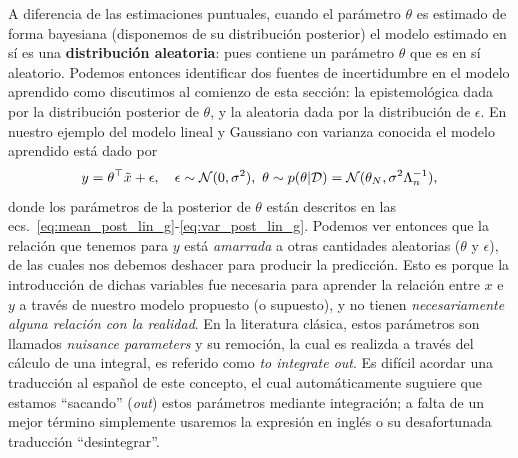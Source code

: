 A diferencia de las estimaciones puntuales, cuando el parámetro $\theta$ es estimado de forma bayesiana (disponemos de su distribución posterior) el modelo estimado en sí es una \textbf{distribución aleatoria}: pues  contiene un parámetro $\theta$ que es en sí aleatorio. Podemos entonces identificar dos fuentes de incertidumbre en el modelo aprendido como discutimos al comienzo de esta sección: la epistemológica dada por la distribución posterior de $\theta$, y la aleatoria dada por la distribución de $\epsilon$. En nuestro ejemplo del modelo lineal y Gaussiano con varianza conocida el modelo aprendido está dado por
\begin{equation}
		 y = \theta^\top \tilde{x} + \epsilon, \quad \epsilon \sim \cN(0,\sigma^2),\ \theta \sim p(\theta|\datos) = \cN(\theta_N,\sigma^2\Lambda_n^{-1}),
\end{equation}
donde los parámetros de la posterior de $\theta$ están descritos en las ecs.~\eqref{eq:mean_post_lin_g}-\eqref{eq:var_post_lin_g}. Podemos ver entonces que la relación que tenemos para $y$ está \emph{amarrada} a otras cantidades aleatorias ($\theta$ y $\epsilon$), de las cuales nos debemos deshacer para producir la predicción. Esto es porque la introducción de dichas variables fue necesaria para aprender la relación entre $x$ e $y$ a través de nuestro modelo propuesto (o supuesto), y no tienen \emph{necesariamente alguna relación con la realidad}. En la literatura clásica, estos parámetros son llamados \emph{nuisance parameters} y su remoción, la cual es realizda a través del cálculo de una integral, es referido como \emph{to integrate out}. Es difícil acordar una traducción al español de este concepto, el cual automáticamente suguiere que estamos ``sacando'' (\emph{out}) estos parámetros mediante integración; a falta de un mejor término simplemente usaremos la expresión en inglés o su desafortunada traducción ``desintegrar''. 


